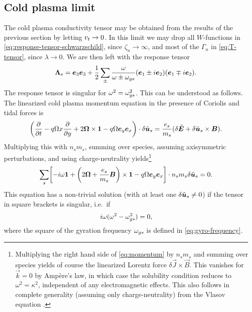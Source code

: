 \documentclass[aps,pre,notitlepage,amsmath,amssymb,amsfonts,nobibnotes,nofootinbib]{revtex4-1}
\begin{document}
\subsection{Cold plasma limit}
\label{sec:cold}

The cold plasma conductivity tensor may be obtained from the results of the
previous section by letting $v_t\to0$. In this limit we may drop all
$W$-functions in \cref{eq:response-tensor-schwarzschild}, since
$\zeta_n\to\infty$, and most of the $\Gamma_n$ in \cref{eq:T-tensor}, since
$\lambda\to0$. We are then left with the response tensor
\begin{equation}
  \label{eq:cold-response}
  \mathbf{\Lambda}_s = \vec{e}_3\vec{e}_3
  + \frac{1}{2}\sum_\pm\frac{\omega}{\omega\pm\omgs}
  (\vec{e}_1\pm i\vec{e}_2)(\vec{e}_1\mp i\vec{e}_2).
\end{equation}
The response tensor is singular for $\omega^2=\omega_{gs}^2$. This can be understood
as follows. The linearized cold plasma momentum equation in the presence of
Coriolis and tidal forces is
\begin{equation}
  \label{eq:momentum}
  \left(
    \pder{}{t} - q\Omega x\pder{}{y}
    + 2\vec{\Omega}\times\mathbf{1} - q\Omega\ey\ex
  \right)\cdot\delta\tvec{u}_s =
  \frac{\qs}{m_s}(\delta\tvec{E} + \delta\tvec{u}_s\times\vec{B}).
\end{equation}
Multiplying this with $n_s{}m_s$, summing over species, assuming axisymmetric
perturbations, and using charge-neutrality yields\footnote{Multiplying the
  right hand side of \cref{eq:momentum} by $n_s{}m_s$ and summing over species
  yields of course the linearized Lorentz force $\delta\vec{J}\times\vec{B}$.
  This vanishes for $\vec{k}=0$ by Ampère's law, in which case the solubility
  condition reduces to $\omega^2=\kappa^2$, independent of any electromagnetic
  effects. This also follows in complete generality (assuming only
  charge-neutrality) from the Vlasov equation .}
\begin{equation}
  \label{eq:sum-cold-momentum}
  \sums\left[
    -i\omega\mathbf{1}
    + \left(2\vec{\Omega} + \frac{\qs}{m_s}\vec{B}\right)\times\mathbf{1}
    - q\Omega\ey\ex
  \right]\cdot n_s m_s\delta\tvec{u}_s = 0.
\end{equation}
This equation has a non-trivial solution (with at least one
$\delta\tilde{\bm{u}}_s\ne0$) if the tensor in square brackets is singular, i.e.\ if
\begin{equation}
  i\omega(\omega^2 - \omega_{gs}^2) = 0,
\end{equation}
where the square of the gyration frequency $\omega_{gs}$ is defined in
\cref{eq:gyro-frequency}.
\end{document}
